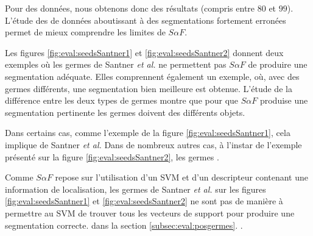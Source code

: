 Pour  des données, nous obtenons donc des résultats  (compris entre $80$ et $99$). L'étude des  de données aboutissant à des segmentations fortement erronées permet de mieux comprendre les limites de $S \alpha F$. 

Les figures \ref{fig:eval:seedsSantner1} et \ref{fig:eval:seedsSantner2} donnent deux exemples où les germes de Santner \textit{et al.} ne permettent pas  $S \alpha F$ de produire une segmentation adéquate. Elles comprennent également un exemple, où, avec des germes différents, une segmentation bien meilleure est obtenue. L'étude de la différence entre les deux types de germes montre que pour que $S \alpha F$ produise une segmentation pertinente les germes doivent  des différents objets. 

Dans certains cas, comme  l'exemple de la figure \ref{fig:eval:seedsSantner1}, cela implique  de Santner \textit{et al.} Dans de nombreux autres cas, à l'instar de l'exemple présenté sur la figure \ref{fig:eval:seedsSantner2}, les germes . 

Comme $S \alpha F$ repose sur l'utilisation d'un SVM et d'un descripteur contenant une information de localisation, les germes de Santner \textit{et al.} sur les figures \ref{fig:eval:seedsSantner1} et \ref{fig:eval:seedsSantner2} ne sont pas  de manière à permettre au  SVM de trouver tous les vecteurs de support  pour produire une segmentation correcte.  dans la section \ref{subsec:eval:posgermes}. .

